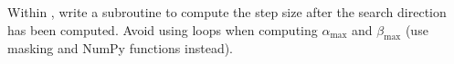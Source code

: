  %

\begin{problem} %
Within , write a subroutine to compute the step size after the search direction has been computed.
Avoid using loops when computing $\alpha_{\max}$ and $\beta_{\max}$ (use masking and NumPy functions instead).
\end{problem}

